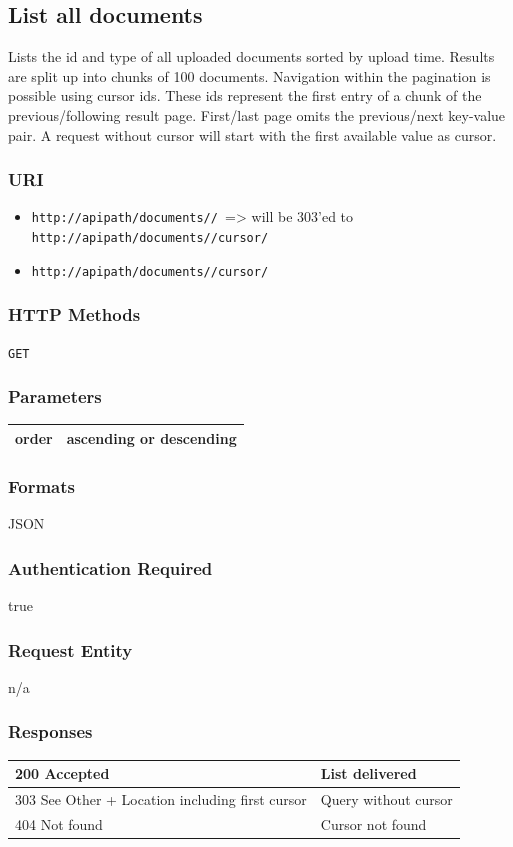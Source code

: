 \documentclass[10pt]{article}
\begin{document}
\subsection{List all documents}
Lists the id and type of all uploaded documents sorted by upload time. Results are split up into chunks of 100 documents. Navigation within the pagination is possible using cursor ids. These ids represent the first entry of a chunk of the previous/following result page. First/last page omits the previous/next key-value pair. A request without cursor will start with the first available value as cursor.
\subsubsection{URI}
\begin{itemize}
\item \texttt{http://apipath/documents// }=> will be 303'ed  to \texttt{http://apipath/documents//cursor/
}\item \texttt{http://apipath/documents//cursor/
}\end{itemize}
\subsubsection{HTTP Methods}
\texttt{GET}
\subsubsection{Parameters}
\begin{tabular}{|l|l|}\hline
order & ascending or descending \\
\hline
\end{tabular}
\subsubsection{Formats}
JSON
\subsubsection{Authentication Required}
true
\subsubsection{Request Entity}
n/a
\subsubsection{Responses}
\begin{tabular}{|l|l|}\hline
200 Accepted & List delivered \\
\hline
303 See Other + Location including first cursor & Query without cursor \\
\hline
404 Not found & Cursor not found \\
\hline
\end{tabular}
\end{document}
